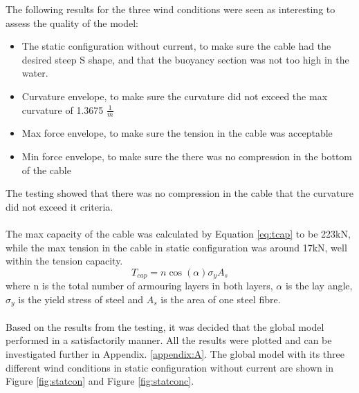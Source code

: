 The following results for the three wind conditions were seen as interesting to assess the quality of the model:
\begin{itemize}
    \item The static configuration without current, to make sure the cable had the desired steep S shape, and that the buoyancy section was not too high in the water.
    \item Curvature envelope, to make sure the curvature did not exceed the max curvature of 1.3675 $\frac{1}{m}$
    \item Max force envelope, to make sure the tension in the cable was acceptable
    \item Min force envelope, to make sure the there was no compression in the bottom of the cable
\end{itemize}
The testing showed that there was no compression in the cable that the curvature did not exceed it criteria. \\\\  The max capacity of the cable was calculated by Equation \ref{eq:tcap} to be 223kN, while the max tension in the cable in static configuration was around 17kN, well within the tension capacity.
\begin{equation}
    T_{cap}=n \cos{(\alpha)} \sigma_y A_s
   \label{eq:tcap}
\end{equation}
where n is the total number of armouring layers in both layers, $\alpha$ is the lay angle, $\sigma_y$ is the yield stress of steel and $A_s$ is the area of one steel fibre.\\\\ 
Based on the results from the testing, it was decided that the global model performed in a satisfactorily manner. All the results were plotted and can be investigated further in Appendix.  \ref{appendix:A}. \newline
\newline
The global model with its three different wind conditions in static configuration without current are shown in Figure \ref{fig:statcon} and Figure \ref{fig:statconc}. 
